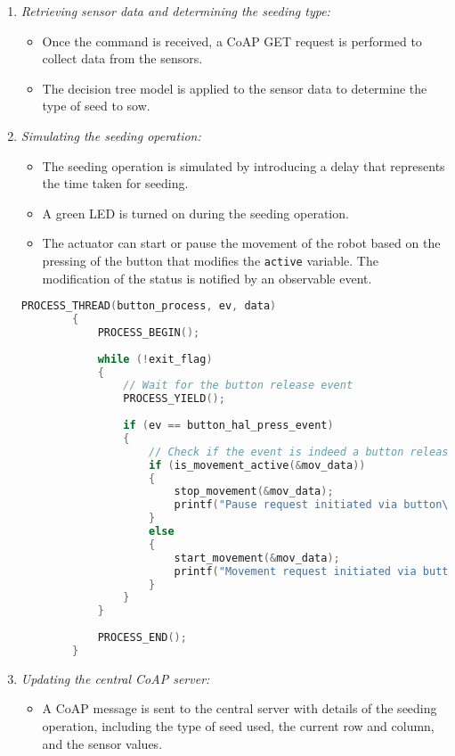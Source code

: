 \begin{enumerate}
    \item \textit{Retrieving sensor data and determining the seeding type:}
          \begin{itemize}
              \item Once the command is received, a CoAP GET request is performed to collect data from the sensors.
              \item The decision tree model is applied to the sensor data to determine the type of seed to sow.
          \end{itemize}

    \item \textit{Simulating the seeding operation:}
          \begin{itemize}
              \item The seeding operation is simulated by introducing a delay that represents the time taken for seeding.
              \item A green LED is turned on during the seeding operation.
              \item The actuator can start or pause the movement of the robot based on the pressing of the button that modifies the \texttt{active} variable.
              The modification of the status is notified by an observable event.
          \end{itemize}

          \begin{lstlisting}[language=C]
        PROCESS_THREAD(button_process, ev, data)
        {
            PROCESS_BEGIN();
        
            while (!exit_flag)
            {
                // Wait for the button release event
                PROCESS_YIELD();
        
                if (ev == button_hal_press_event)
                {
                    // Check if the event is indeed a button release event
                    if (is_movement_active(&mov_data))
                    {
                        stop_movement(&mov_data);
                        printf("Pause request initiated via button\n");
                    }
                    else
                    {
                        start_movement(&mov_data);
                        printf("Movement request initiated via button\n");
                    }
                }
            }
        
            PROCESS_END();
        }
        \end{lstlisting}


    \item \textit{Updating the central CoAP server:}
          \begin{itemize}
              \item A CoAP message is sent to the central server with details of the seeding operation, including the type of seed used, the current row and column, and the sensor values.
          \end{itemize}


\end{enumerate}
